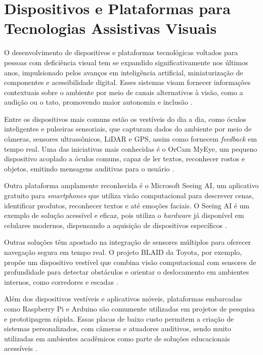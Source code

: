 \section{\textbf{Dispositivos e Plataformas para Tecnologias Assistivas Visuais}}

O desenvolvimento de dispositivos e plataformas tecnológicas voltados para pessoas com deficiência visual tem se expandido significativamente nos últimos anos, impulsionado pelos avanços em inteligência artificial, miniaturização de componentes e acessibilidade digital. Esses sistemas visam fornecer informações contextuais sobre o ambiente por meio de canais alternativos à visão, como a audição ou o tato, promovendo maior autonomia e inclusão \cite{Saeedi2021}.

Entre os dispositivos mais comuns estão os vestíveis do dia a dia, como óculos inteligentes e pulseiras sensoriais, que capturam dados do ambiente por meio de câmeras, sensores ultrassônicos, LiDAR e GPS, assim como fornecem \textit{feedback} em tempo real. Uma das iniciativas mais conhecidas é o OrCam MyEye, um pequeno dispositivo acoplado a óculos comuns, capaz de ler textos, reconhecer rostos e objetos, emitindo mensagens auditivas para o usuário \cite{OrCam2022}.

Outra plataforma amplamente reconhecida é o Microsoft Seeing AI, um aplicativo gratuito para \textit{smartphones} que utiliza visão computacional para descrever cenas, identificar produtos, reconhecer textos e até emoções faciais. O Seeing AI é um exemplo de solução acessível e eficaz, pois utiliza o \textit{hardware} já disponível em celulares modernos, dispensando a aquisição de dispositivos específicos \cite{Microsoft2023}.

Outras soluções têm apostado na integração de sensores múltiplos para oferecer navegação segura em tempo real. O projeto BLAID da Toyota, por exemplo, propõe um dispositivo vestível que combina visão computacional com sensores de profundidade para detectar obstáculos e orientar o deslocamento em ambientes internos, como corredores e escadas \cite{Toyota2018}.

Além dos dispositivos vestíveis e aplicativos móveis, plataformas embarcadas como Raspberry Pi e Arduino são comumente utilizadas em projetos de pesquisa e prototipagem rápida. Essas placas de baixo custo permitem a criação de sistemas personalizados, com câmeras e atuadores auditivos, sendo muito utilizadas em ambientes acadêmicos como parte de soluções educacionais acessíveis \cite{Pino2020}.

